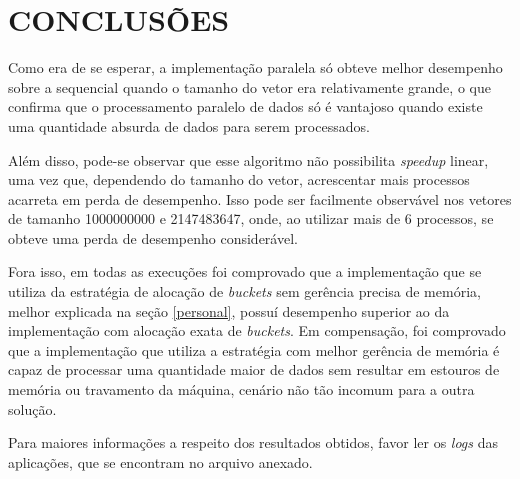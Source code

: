 \section{\normalsize CONCLUSÕES}
	Como era de se esperar, a implementação paralela só obteve melhor desempenho sobre a sequencial quando o tamanho do vetor era relativamente grande, o que confirma que o processamento paralelo de dados só é vantajoso quando existe uma quantidade absurda de dados para serem processados. 
	
	Além disso, pode-se observar que esse algoritmo não possibilita \textit{speedup} linear, uma vez que, dependendo do tamanho do vetor, acrescentar mais processos acarreta em perda de desempenho. Isso pode ser facilmente observável nos vetores de tamanho 1000000000 e 2147483647, onde, ao utilizar mais de 6 processos, se obteve uma perda de desempenho considerável.
	
	Fora isso, em todas as execuções foi comprovado que a implementação que se utiliza da estratégia de alocação de \textit{buckets} sem gerência precisa de memória, melhor explicada na seção \ref{personal}, possuí desempenho superior ao da implementação com alocação exata de \textit{buckets}. Em compensação, foi comprovado que a implementação que utiliza a estratégia com melhor gerência de memória é capaz de processar uma quantidade maior de dados sem resultar em estouros de memória ou travamento da máquina, cenário não tão incomum para a outra solução.
	
	Para maiores informações a respeito dos resultados obtidos, favor ler os \textit{logs} das aplicações, que se encontram no arquivo anexado.